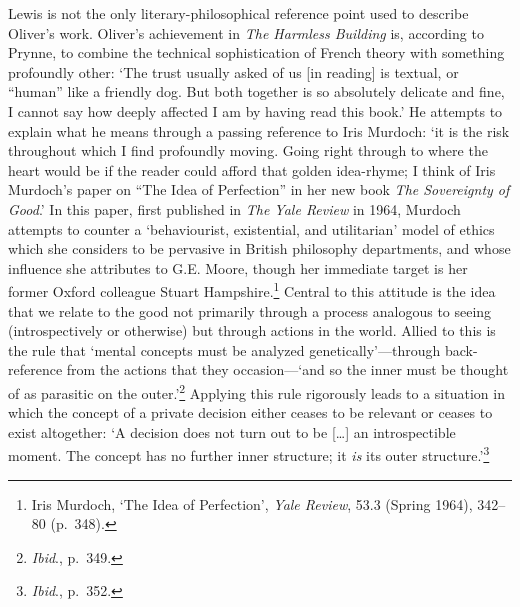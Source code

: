 \documentclass[]{article}
\begin{document}
Lewis is not the only literary-philosophical reference point used to
describe Oliver's work. Oliver's achievement in \emph{The Harmless
Building} is, according to Prynne, to combine the technical
sophistication of French theory with something profoundly other: `The
trust usually asked of us {[}in reading{]} is textual, or ``human'' like
a friendly dog. But both together is so absolutely delicate and fine, I
cannot say how deeply affected I am by having read this book.' He
attempts to explain what he means through a passing reference to Iris
Murdoch: `it is the risk throughout which I find profoundly moving.
Going right through to where the heart would be if the reader could
afford that golden idea-rhyme; I think of Iris Murdoch's paper on ``The
Idea of Perfection'' in her new book \emph{The Sovereignty of Good}.' In
this paper, first published in \emph{The Yale Review} in 1964, Murdoch
attempts to counter a `behaviourist, existential, and utilitarian' model
of ethics which she considers to be pervasive in British philosophy
departments, and whose influence she attributes to G.E. Moore, though
her immediate target is her former Oxford colleague Stuart
Hampshire.\footnote{Iris Murdoch, `The Idea of Perfection', \emph{Yale
  Review}, 53.3 (Spring 1964), 342--80 (p.~348).} Central to this
attitude is the idea that we relate to the good not primarily through a
process analogous to seeing (introspectively or otherwise) but through
actions in the world. Allied to this is the rule that `mental concepts
must be analyzed genetically'---through back-reference from the actions
that they occasion---`and so the inner must be thought of as parasitic
on the outer.'\footnote{\emph{Ibid}., p.~349.} Applying this rule
rigorously leads to a situation in which the concept of a private
decision either ceases to be relevant or ceases to exist altogether: `A
decision does not turn out to be {[}\ldots{}{]} an introspectible
moment. The concept has no further inner structure; it \emph{is} its
outer structure.'\footnote{\emph{Ibid}., p.~352.}
\end{document}
